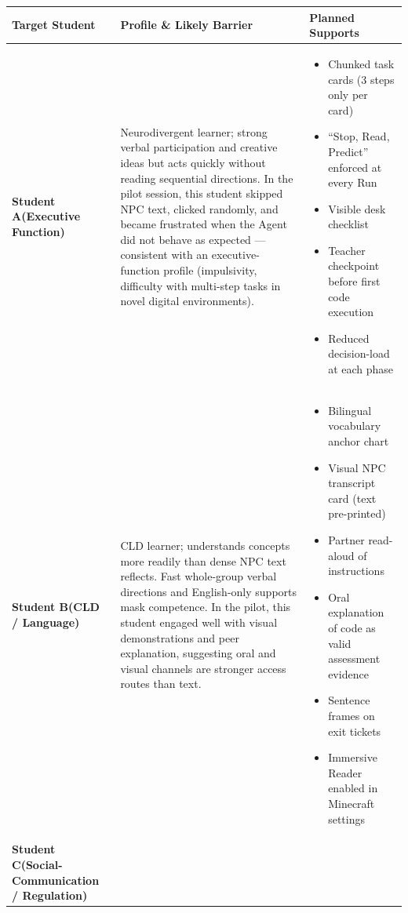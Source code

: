 \documentclass[12pt]{article}
\newcommand{\arow}{\rowcolor{altRow}}
\begin{document}
\begin{tabularx}{\textwidth}{|>{\bfseries\color{brickRed}}P{1.7in}|P{2.4in}|L|}
\hline
{}\color{white}\bfseries Target Student & \color{white}\bfseries Profile \& Likely Barrier & \color{white}\bfseries Planned Supports \\
\hline
Student A\newline (Executive Function) &
  Neurodivergent learner; strong verbal participation and creative ideas but acts quickly without reading sequential directions. In the pilot session, this student skipped NPC text, clicked randomly, and became frustrated when the Agent did not behave as expected --- consistent with an executive-function profile (impulsivity, difficulty with multi-step tasks in novel digital environments). &
  \begin{itemize}[nosep]
  \item Chunked task cards (3 steps only per card)
  \item ``Stop, Read, Predict'' enforced at every Run
  \item Visible desk checklist
  \item Teacher checkpoint before first code execution
  \item Reduced decision-load at each phase
  \end{itemize} \\
\hline
\arow Student B\newline (CLD / Language) &
  CLD learner; understands concepts more readily than dense NPC text reflects. Fast whole-group verbal directions and English-only supports mask competence. In the pilot, this student engaged well with visual demonstrations and peer explanation, suggesting oral and visual channels are stronger access routes than text. &
  \begin{itemize}[nosep]
  \item Bilingual vocabulary anchor chart
  \item Visual NPC transcript card (text pre-printed)
  \item Partner read-aloud of instructions
  \item Oral explanation of code as valid assessment evidence
  \item Sentence frames on exit tickets
  \item Immersive Reader enabled in Minecraft settings
  \end{itemize} \\
\hline
Student C\newline (Social-Communication / Regulation) &

\end{tabularx}
\end{document}
